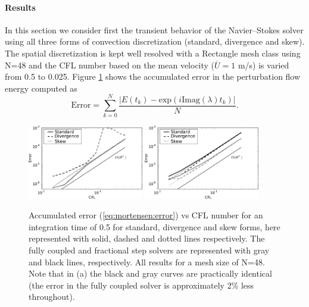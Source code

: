 \paragraph{Results}
In this section we consider first the transient behavior of the Navier--Stokes solver using all three forms of convection discretization (standard, divergence and skew). The spatial discretization is kept well resolved with a Rectangle mesh class using N=48 and the CFL number based on the mean velocity ($\overline{U}=1$ m/s) is varied from 0.5 to 0.025. Figure \ref{fig:mortensen:OS_init_cfl}  shows the accumulated error in the perturbation flow energy computed as
\begin{equation}
 \text{Error} = \sum_{k=0}^N \frac{|E(t_k)-\text{exp}(i \text{Imag}(\lambda) t_k)|}{N}.
 \label{eq:mortensen:error}
\end{equation}
\begin{figure}
 \includegraphics[width=0.45\textwidth]{chapters/mortensen/pdf/OS_init_cfl_1.pdf}
 \includegraphics[width=0.45\textwidth]{chapters/mortensen/pdf/OS_init_cfl_0.pdf}
 \caption{Accumulated error (\eqref{eq:mortensen:error}) vs CFL number for an integration time of 0.5 for standard, divergence and skew forms, here represented with solid, dashed and dotted lines respectively. The fully coupled and fractional step solvers are represented with gray and black lines, respectively. All results for a mesh size of N=48. Note that in (a) the black and gray curves are practically identical (the error in the fully coupled solver is approximately 2\% less throughout). }
\label{fig:mortensen:OS_init_cfl}
\end{figure}

